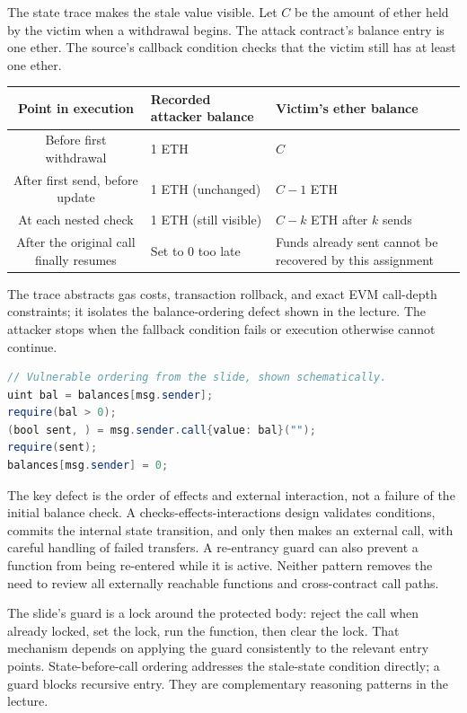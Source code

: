 \documentclass[11pt,a4paper]{article}
\numberwithin{figure}{section}
\begin{document}
The state trace makes the stale value visible. Let $C$ be the amount of ether held by the victim when a withdrawal begins. The attack contract's balance entry is one ether. The source's callback condition checks that the victim still has at least one ether.
\begin{center}\small
\begin{tabularx}{\linewidth}{@{}cYY@{}}\toprule
Point in execution & Recorded attacker balance & Victim's ether balance\\\midrule
Before first withdrawal & 1 ETH & $C$\\
After first send, before update & 1 ETH (unchanged) & $C-1$ ETH\\
At each nested check & 1 ETH (still visible) & $C-k$ ETH after $k$ sends\\
After the original call finally resumes & Set to 0 too late & Funds already sent cannot be recovered by this assignment\\\bottomrule
\end{tabularx}\end{center}
The trace abstracts gas costs, transaction rollback, and exact EVM call-depth constraints; it isolates the balance-ordering defect shown in the lecture. The attacker stops when the fallback condition fails or execution otherwise cannot continue.

\begin{lstlisting}[language=Java]
// Vulnerable ordering from the slide, shown schematically.
uint bal = balances[msg.sender];
require(bal > 0);
(bool sent, ) = msg.sender.call{value: bal}("");
require(sent);
balances[msg.sender] = 0;
\end{lstlisting}
The key defect is the order of effects and external interaction, not a failure of the initial balance check. A checks-effects-interactions design validates conditions, commits the internal state transition, and only then makes an external call, with careful handling of failed transfers. A re-entrancy guard can also prevent a function from being re-entered while it is active. Neither pattern removes the need to review all externally reachable functions and cross-contract call paths.

The slide's guard is a lock around the protected body: reject the call when already locked, set the lock, run the function, then clear the lock. That mechanism depends on applying the guard consistently to the relevant entry points. State-before-call ordering addresses the stale-state condition directly; a guard blocks recursive entry. They are complementary reasoning patterns in the lecture.
\end{document}
